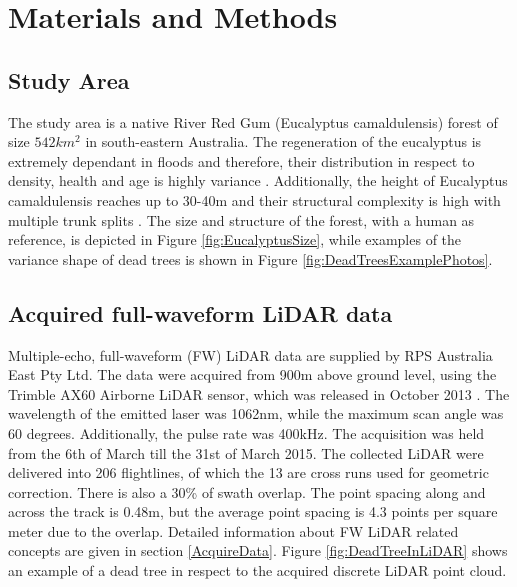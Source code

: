 \documentclass{subfiles}
\begin{document}
	
	


\section{Materials and Methods}

\subsection{Study Area}

The study area is a native River Red Gum (Eucalyptus camaldulensis) forest  of size $542km^2$ in south-eastern Australia. The regeneration of the eucalyptus is extremely dependant in floods and therefore, their distribution in respect to density, health and age is highly variance \cite{Kerle2005}. Additionally, the height of Eucalyptus camaldulensis reaches up to 30-40m and their structural complexity is high with multiple trunk splits \cite{Wilson1995}. The size and structure of the forest, with a human as reference, is depicted in Figure \ref{fig:EucalyptusSize}, while examples of the variance shape of dead trees is shown in Figure \ref{fig:DeadTreesExamplePhotos}. 






\subsection{Acquired full-waveform LiDAR data}

\par Multiple-echo, full-waveform (FW) LiDAR data are supplied by RPS Australia East Pty Ltd. The data were acquired from 900m above ground level, using the Trimble AX60 Airborne LiDAR sensor, which was released in October 2013 \cite{Trimble}. The wavelength of the emitted laser was 1062nm, while the maximum scan angle was 60 degrees. Additionally, the pulse rate was 400kHz. The acquisition was held from the 6th of March till the 31st of March 2015.  The collected LiDAR were delivered into 206 flightlines, of which the 13 are cross runs used for geometric correction. There is also a 30\% of swath overlap. The point spacing along and across the track  is 0.48m, but the average point spacing is 4.3 points per square meter due to the overlap. Detailed information about FW LiDAR related concepts are given in section \ref{AcquireData}. Figure \ref{fig:DeadTreeInLiDAR} shows an example of a dead tree in respect to the acquired discrete LiDAR point cloud.  
\end{document}
